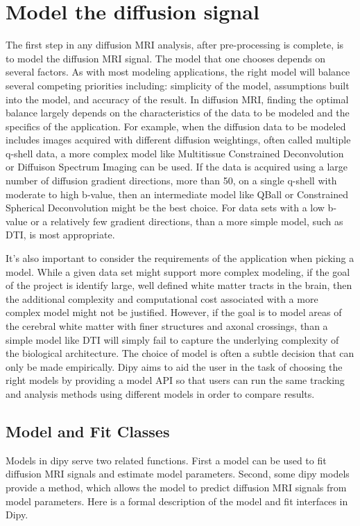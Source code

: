 \section{Model the diffusion signal}
The first step in any diffusion MRI analysis, after pre-processing is complete, is to model the diffusion MRI signal. The model that one chooses depends on several factors. As with most modeling applications, the right model will balance several competing priorities including: simplicity of the model, assumptions built into the model, and accuracy of the result. In diffusion MRI, finding the optimal balance largely depends on the characteristics of the data to be modeled and the specifics of the application. For example, when the diffusion data to be modeled includes images acquired with different diffusion weightings, often called multiple q-shell data, a more complex model like Multitissue Constrained Deconvolution or Diffuison Spectrum Imaging can be used. If the data is acquired using a large number of diffusion gradient directions, more than 50, on a single q-shell with moderate to high b-value, then an intermediate model like QBall or Constrained Spherical Deconvolution might be the best choice. For data sets with a low b-value or a relatively few gradient directions, than a more simple model, such as DTI, is most appropriate. 

It's also important to consider the requirements of the application when picking a model. While a given data set might support more complex modeling, if the goal of the project is identify large, well defined white matter tracts in the brain, then the additional complexity and computational cost associated with a more complex model might not be justified. However, if the goal is to model areas of the cerebral white matter with finer structures and axonal crossings, than a simple model like DTI will simply fail to capture the underlying complexity of the biological architecture. The choice of model is often a subtle decision that can only be made empirically. Dipy aims to aid the user in the task of choosing the right models by providing a model API so that users can run the same tracking and analysis methods using different models in order to compare results.

\subsection{Model and Fit Classes}
Models in dipy serve two related functions. First a model can be used to fit diffusion MRI signals and estimate model parameters. Second, some dipy models provide a  method, which allows the model to predict diffusion MRI signals from model parameters. Here is a formal description of the model and fit interfaces in Dipy.

